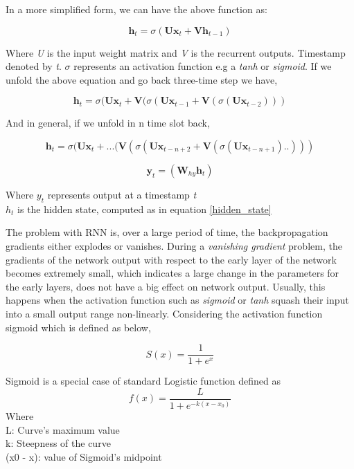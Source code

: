 In a more simplified form, we can have the above function as:

\begin{equation}\label{hidden_state}
	\textbf{h}_t = \sigma (\textbf{Ux}_t + \textbf{Vh}_{t-1}) 
\end{equation}

Where \textit{U} is the input weight matrix and \textit{V} is the recurrent outputs. Timestamp denoted by \textit{t}. $\sigma$ represents an activation function e.g a \textit{tanh} or \textit{sigmoid}. If we unfold the above equation and go back three-time step we have,

\begin{equation}
	\textbf{h}_t = \sigma (\textbf{Ux}_t + \textbf{V}(\sigma(\textbf{Ux}_{t-1} + \textbf{V}(\sigma(\textbf{Ux}_{t-2})))
\end{equation}

And in general, if we unfold in n time slot back,

\begin{equation}
\textbf{h}_t = \sigma (\textbf{Ux}_t + ...( \textbf{V}(\sigma(\textbf{Ux}_{t-n+2} + \textbf{V}(\sigma(\textbf{Ux}_{t-n+1})..)))
\end{equation}

\begin{equation}
	\textbf{y}_t = (\textbf{W}_{hy}  \textbf{h}_{t}) 
\end{equation}

Where \textbf{$y_t$}  represents output at a timestamp \textit{t} \\
\textbf{$h_t$} is the hidden state, computed as in equation \ref{hidden_state}

The problem with RNN is, over a large period of time, the backpropagation gradients either explodes or vanishes. During a \textit{vanishing gradient } problem, the gradients of the network output with respect to the early layer of the network becomes extremely small, which indicates a large change in the parameters for the early layers, does not have a big effect on network output. Usually, this happens when the activation function such as \textit{sigmoid} or \textit{tanh} squash their input into a small output range non-linearly. Considering the activation function sigmoid which is defined as below,

\begin{equation}
	S(x) = \frac{1}{ 1+ e^x}
\end{equation}

Sigmoid is a special case of standard Logistic function defined as 
\begin{equation}
f(x) = \frac{L}{ 1+ e^{-k(x-x_0)}}
\end{equation}
Where \\
L: Curve's maximum value \\
k: Steepness of the curve \\
(x0 - x): value of Sigmoid's midpoint \\

